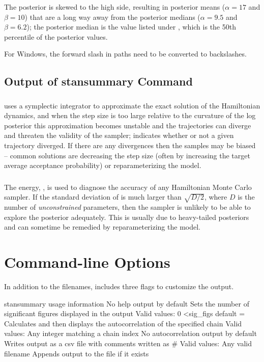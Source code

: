 %
The posterior is skewed to the high side, resulting in posterior means
($\alpha=17$ and $\beta=10$) that are a long way away from the posterior
medians ($\alpha=9.5$ and $\beta=6.2$);  the posterior median is the
value listed under , which is the 50th percentile of the
posterior values.

For Windows, the forward slash in paths need to be converted to backslashes.


\subsection{Output of stansummary Command}

\subsubsection{}

\CmdStan uses a symplectic integrator to approximate the exact
solution of the Hamiltonian dynamics, and when the step size is too
large relative to the curvature of the log posterior this
approximation becomes unstable and the trajectories can diverge and
threaten the validity of the sampler;  indicates whether
or not a given trajectory diverged.  If there are any divergences then 
the samples may be biased -- common solutions are decreasing the
step size (often by increasing the target average acceptance probability)
or reparameterizing the model.

\subsubsection{}

The energy, , is used to diagnose the accuracy of any Hamiltonian
Monte Carlo sampler.  If the standard deviation of  is much larger
than $\sqrt{D / 2}$, where $D$ is the number of \emph{unconstrained}
parameters, then the sampler is unlikely to be able to explore the
posterior adequately.  This is usually due to heavy-tailed posteriors and
can sometime be remedied by reparameterizing the model.

\section{Command-line Options}

In addition to the filenames,  includes three flags to
customize the output.

\begin{description}
 {stansummary usage information} {No help output by default}
%
{Sets the number of significant figures displayed in the output}
{Valid values: 0 \textless sig\_figs}
{default = }
%
{Calculates and then displays the autocorrelation of the specified chain}
{Valid values: Any integer matching a chain index}
{No autocorrelation output by default}
%
       {Writes output as a csv file with comments written as \#}
       {Valid values: Any valid filename}
       {Appends output to the file if it exists}
\end{description}
